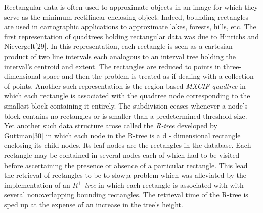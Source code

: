 \hspace{30} Rectangular   data   is   often   used   to   approximate   objects   in   an   image   for  
which   they   serve   as   the   minimum   rectilinear   enclosing   object.   Indeed,   bounding  
rectangles   are   used   in   cartographic   applications   to   approximate   lakes,   forests,  
hills,   etc.   The   first   representation   of   quadtrees   holding   rectangular   data   was  
due   to   Hinrichs   and   Nievergelt[29].   In   this   representation,   each   rectangle   is  
seen   as   a   cartesian   product   of   two   line   intervals   each   analogous   to   an   interval  
tree   holding   the   interval's   centroid   and   extent.   The   rectangles   are   reduced   to  
points   in   three­dimensional   space   and   then   the   problem   is   treated   as   if   dealing  
with   a   collection   of   points.   Another   such   representation   is   the   region­-based  
\textit{MX­CIF   quadtree}   in   which   each   rectangle   is   associated   with   the   quadtree   node  
corresponding   to   the   smallest   block   containing   it   entirely.   The   subdivision  
ceases   whenever   a   node's   block   contains   no   rectangles   or   is   smaller   than   a  
predetermined   threshold   size.   Yet   another   such   data   structure   arose   called   the  
\textit{R­-tree}   developed   by   Guttman[30]   in   which   each   node   in   the   R-­tree   is   a  
d - ­dimensional   rectangle   enclosing   its   child   nodes.   Its   leaf   nodes   are   the  
rectangles   in   the   database.   Each   rectangle   may   be   contained   in   several   nodes  
each   of   which   had   to   be   visited   before   ascertaining   the   presence   or   absence   of  
a   particular   rectangle.   This   lead   the   retrieval   of   rectangles   to   be   to   slow;a  
problem   which   was   alleviated   by   the   implementation   of   an   \textit{${R^{+}}$-tree}   in   which  
each   rectangle   is   associated   with   with   several   non­overlapping   bounding  
rectangles.   The   retrieval   time   of   the   R­-tree   is   sped   up   at   the   expense   of   an  
increase in the tree's height.

